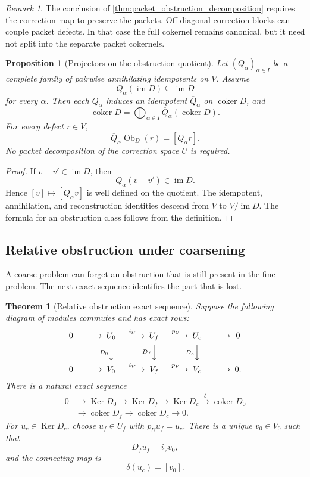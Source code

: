 \documentclass{aomart}
\newtheorem{theorem}{Theorem}[section]
\newtheorem{proposition}[proposition]{Proposition}
\theoremstyle{definition}
\theoremstyle{remark}
\newtheorem{remark}[remark]{Remark}
\newcommand{\im}{\operatorname{im}}
\newcommand{\Ker}{\operatorname{Ker}}
\newcommand{\coker}{\operatorname{coker}}
\newcommand{\Ob}{\operatorname{Ob}}
\begin{document}
\begin{remark}\label{rem:block_diagonal_needed}
The conclusion of \cref{thm:packet_obstruction_decomposition} requires the correction map to preserve the packets.  Off diagonal correction blocks can couple packet defects.  In that case the full cokernel remains canonical, but it need not split into the separate packet cokernels.
\end{remark}

\begin{proposition}[Projectors on the obstruction quotient]\label{prop:obstruction_quotient_projectors}
Let $(Q_\alpha)_{\alpha\in I}$ be a complete family of pairwise annihilating idempotents on $V$.  Assume
\[
Q_\alpha(\im D)\subseteq\im D
\]
for every $\alpha$.  Then each $Q_\alpha$ induces an idempotent $\overline Q_\alpha$ on $\coker D$, and
\[
\coker D
=
\bigoplus_{\alpha\in I}\overline Q_\alpha(\coker D).
\]
For every defect $r\in V$,
\[
\overline Q_\alpha\Ob_D(r)
=
[Q_\alpha r].
\]
No packet decomposition of the correction space $U$ is required.
\end{proposition}

\begin{proof}
If $v-v'\in\im D$, then
\[
Q_\alpha(v-v')\in\im D.
\]
Hence $[v]\mapsto[Q_\alpha v]$ is well defined on the quotient.  The idempotent, annihilation, and reconstruction identities descend from $V$ to $V/\im D$.  The formula for an obstruction class follows from the definition.
\end{proof}

\subsection{Relative obstruction under coarsening}

A coarse problem can forget an obstruction that is still present in the fine problem.  The next exact sequence identifies the part that is lost.

\begin{theorem}[Relative obstruction exact sequence]\label{thm:relative_obstruction_sequence}
Suppose the following diagram of modules commutes and has exact rows:
\[
\begin{CD}
0 @>>> U_0 @>{i_U}>> U_f @>{p_U}>> U_c @>>> 0\\
@. @V{D_0}VV @V{D_f}VV @V{D_c}VV @.\\
0 @>>> V_0 @>{i_V}>> V_f @>{p_V}>> V_c @>>> 0.
\end{CD}
\]
There is a natural exact sequence
\[
\begin{aligned}
0&\longrightarrow\Ker D_0
\longrightarrow\Ker D_f
\longrightarrow\Ker D_c
\xrightarrow{\delta}\coker D_0\\
&\longrightarrow\coker D_f
\longrightarrow\coker D_c
\longrightarrow0.
\end{aligned}
\]
For $u_c\in\Ker D_c$, choose $u_f\in U_f$ with $p_Uu_f=u_c$.  There is a unique $v_0\in V_0$ such that
\[
D_fu_f=i_Vv_0,
\]
and the connecting map is
\[
\delta(u_c)=[v_0].
\]
\end{theorem}
\end{document}
